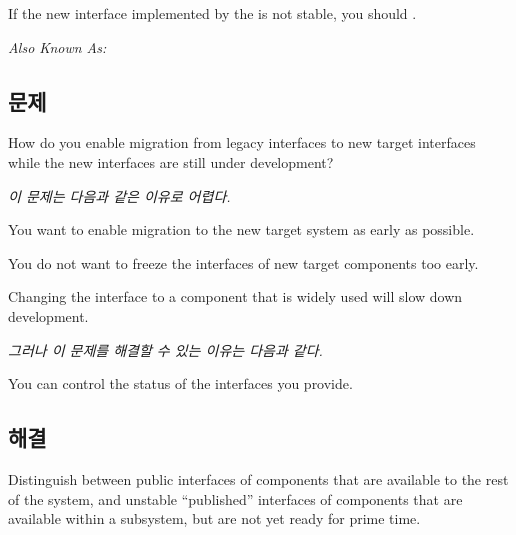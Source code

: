 \documentclass[a4paper,10pt,twoside]{book}
\begin{document}
If the new interface implemented by the  is not stable, you should .


\emph{Also Known As:}   \cite{Ocal00a}


\subsection*{문제}

How do you enable migration from legacy interfaces to new target interfaces while the new interfaces are still under development?

\emph{이 문제는 다음과 같은 이유로 어렵다.}

\begin{bulletlist}
\item You want to enable migration to the new target system as early as possible.

\item You do not want to freeze the interfaces of new target components too early.

\item Changing the interface to a component that is widely used will slow down development.
\end{bulletlist}

\emph{그러나 이 문제를 해결할 수 있는 이유는 다음과 같다.}

\begin{bulletlist}
\item You can control the status of the interfaces you provide.
\end{bulletlist}

\subsection*{해결}

Distinguish between public interfaces of components that are available to the rest of the system, and unstable ``published'' interfaces of components that are available within a subsystem, but are not yet ready for prime time.
\end{document}
